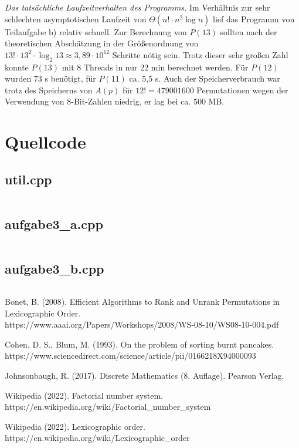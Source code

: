 \documentclass[a4paper, 10pt, ngerman]{article}
\begin{document}
\emph{Das tatsächliche Laufzeitverhalten des Programms.} Im Verhältnis zur sehr schlechten asymptotischen Laufzeit von $\Theta(n! \cdot n^2 \log n)$ lief das Programm von Teilaufgabe b) relativ schnell. Zur Berechnung von $P(13)$ sollten nach der theoretischen Abschätzung in der Größenordnung von $13! \cdot 13^2 \cdot \log_2 13 \approx 3,89 \cdot 10^{12}$ Schritte nötig sein. Trotz dieser sehr großen Zahl konnte $P(13)$ mit 8 Threads in nur 22 min berechnet werden. Für $P(12)$ wurden 73 s benötigt, für $P(11)$ ca. 5,5 s. Auch der Speicherverbrauch war trotz des Speicherns von $A(p)$ für $12! = 479001600$ Permutationen wegen der Verwendung von 8-Bit-Zahlen niedrig, er lag bei ca. 500 MB.  

\section{Quellcode}

\subsection{util.cpp}

\inputminted{c++}{aufgabe3/util.cpp}

\subsection{aufgabe3\_a.cpp}

\inputminted{c++}{aufgabe3/aufgabe3_a.cpp}

\subsection{aufgabe3\_b.cpp}

\inputminted{c++}{aufgabe3/aufgabe3_b.cpp}

\begin{thebibliography}{5}
    Bonet, B. (2008).
    Efficient Algorithms to Rank and Unrank Permutations in Lexicographic Order. \\
    https://www.aaai.org/Papers/Workshops/2008/WS-08-10/WS08-10-004.pdf

    Cohen, D. S., Blum, M. (1993).
    On the problem of sorting burnt pancakes. \\
    https://www.sciencedirect.com/science/article/pii/0166218X94000093

    Johnsonbaugh, R. (2017).
    Discrete Mathematics (8. Auflage).
    Pearson Verlag.

    Wikipedia (2022).
    Factorial number system. \\
    https://en.wikipedia.org/wiki/Factorial\_number\_system

    Wikipedia (2022).
    Lexicographic order. \\
    https://en.wikipedia.org/wiki/Lexicographic\_order
\end{thebibliography}
\end{document}
